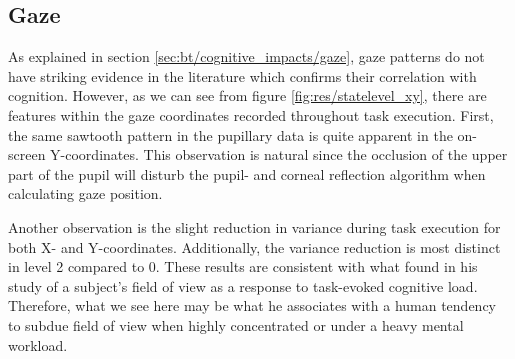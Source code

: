 \subsection{Gaze}

As explained in section \ref{sec:bt/cognitive_impacts/gaze}, gaze patterns do not have striking evidence in the literature which confirms their correlation with cognition. However, as we can see from figure \ref{fig:res/statelevel_xy}, there are features within the gaze coordinates recorded throughout task execution. First, the same sawtooth pattern in the pupillary data is quite apparent in the on-screen Y-coordinates. This observation is natural since the occlusion of the upper part of the pupil will disturb the pupil- and corneal reflection algorithm when calculating gaze position.

Another observation is the slight reduction in variance during task execution for both X- and Y-coordinates. Additionally, the variance reduction is most distinct in level 2 compared to 0. These results are consistent with what \textcite{williams1985} found in his study of a subject's field of view as a response to task-evoked cognitive load. Therefore, what we see here may be what he associates with a human tendency to subdue field of view when highly concentrated or under a heavy mental workload.